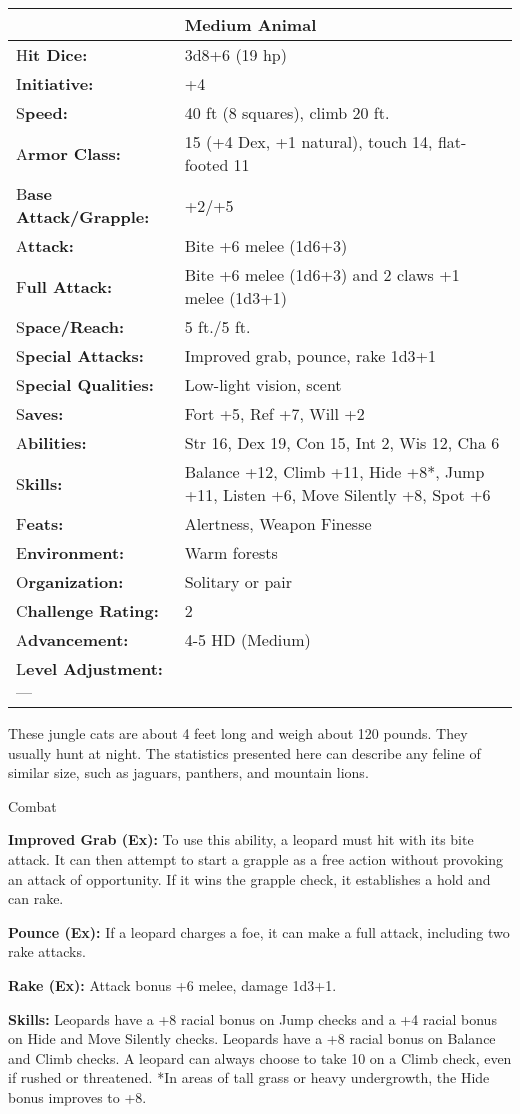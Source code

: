\documentclass{article}
\begin{document}
\begin{tabular}{|>{\raggedright}p{91pt}|>{\raggedright}p{231pt}|}
\hline
  & Medium Animal\tabularnewline
\hline
H\textbf{it Dice:} & 3d8+6 (19 hp)\tabularnewline
\hline
I\textbf{nitiative:} & +4\tabularnewline
\hline
S\textbf{peed:} & 40 ft (8 squares), climb 20 ft.\tabularnewline
\hline
A\textbf{rmor Class:} & 15 (+4 Dex, +1 natural), touch 14, flat-footed 11\tabularnewline
\hline
B\textbf{ase Attack/Grapple:} & +2/+5\tabularnewline
\hline
A\textbf{ttack:} & Bite +6 melee (1d6+3)\tabularnewline
\hline
F\textbf{ull Attack:} & Bite +6 melee (1d6+3) and 2 claws +1 melee (1d3+1)\tabularnewline
\hline
S\textbf{pace/Reach:} & 5 ft./5 ft.\tabularnewline
\hline
S\textbf{pecial Attacks:} & Improved grab, pounce, rake 1d3+1\tabularnewline
\hline
S\textbf{pecial Qualities:} & Low-light vision, scent\tabularnewline
\hline
S\textbf{aves:} & Fort +5, Ref +7, Will +2\tabularnewline
\hline
A\textbf{bilities:} & Str 16, Dex 19, Con 15, Int 2, Wis 12, Cha 6\tabularnewline
\hline
S\textbf{kills:} & Balance +12, Climb +11, Hide +8*, Jump +11, Listen +6, Move 
Silently +8, Spot +6\tabularnewline
\hline
F\textbf{eats:} & Alertness, Weapon Finesse\tabularnewline
\hline
E\textbf{nvironment:} & Warm forests\tabularnewline
\hline
O\textbf{rganization:} & Solitary or pair\tabularnewline
\hline
C\textbf{hallenge Rating:} & 2\tabularnewline
\hline
A\textbf{dvancement:} & 4-5 HD (Medium)\tabularnewline
\hline
L\textbf{evel Adjustment:}--- & \tabularnewline
\hline
\end{tabular}

These jungle cats are about 4 feet long and weigh about 120 pounds. They usually 
hunt at night. The statistics presented here can describe any feline of similar 
size, such as jaguars, panthers, and mountain lions.

Combat

\textbf{Improved Grab (Ex): }To use this ability, a leopard must hit with its bite 
attack. It can then attempt to start a grapple as a free action without provoking 
an attack of opportunity. If it wins the grapple check, it establishes a hold and 
can rake.

\textbf{Pounce (Ex):} If a leopard charges a foe, it can make a full attack, including 
two rake attacks.

\textbf{Rake (Ex): }Attack bonus +6 melee, damage 1d3+1.

\textbf{Skills: }Leopards have a +8 racial bonus on Jump checks and a +4 racial 
bonus on Hide and Move Silently checks. Leopards have a +8 racial bonus on Balance 
and Climb checks. A leopard can always choose to take 10 on a Climb check, even 
if rushed or threatened. *In areas of tall grass or heavy undergrowth, the Hide 
bonus improves to +8.
\end{document}
